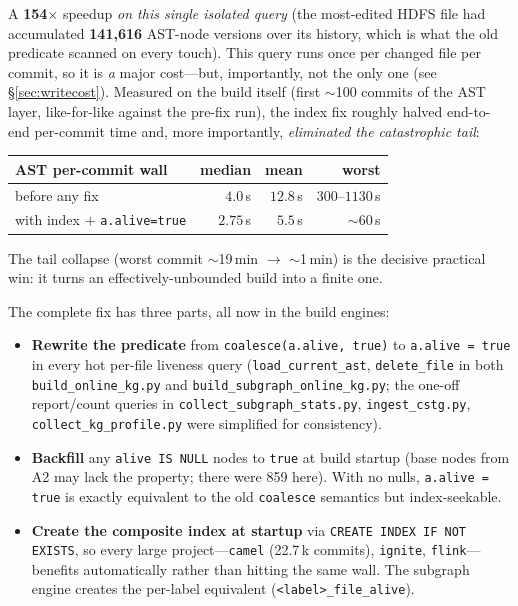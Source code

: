 \documentclass[11pt]{article}
\newcommand{\code}[1]{\texttt{#1}}
\begin{document}
A \textbf{154$\times$} speedup \emph{on this single isolated query} (the most-edited
HDFS file had accumulated \textbf{141{,}616} AST-node versions over its history,
which is what the old predicate scanned on every touch). This query runs once per
changed file per commit, so it is \emph{a} major cost---but, importantly, not the
only one (see \S\ref{sec:writecost}). Measured on the build itself (first
$\sim$100 commits of the AST layer, like-for-like against the pre-fix run), the
index fix roughly halved end-to-end per-commit time and, more importantly,
\emph{eliminated the catastrophic tail}:

\begin{center}
\begin{tabular}{@{}lrrr@{}}
\toprule
AST per-commit wall & median & mean & worst \\
\midrule
before any fix & $4.0$\,s & $12.8$\,s & $300$--$1130$\,s \\
with index $+$ \code{a.alive=true} & $2.75$\,s & $5.5$\,s & $\sim$$60$\,s \\
\bottomrule
\end{tabular}
\end{center}

The tail collapse (worst commit $\sim$19\,min $\to$ $\sim$1\,min) is the decisive
practical win: it turns an effectively-unbounded build into a finite one.

The complete fix has three parts, all now in the build engines:
\begin{itemize}
  \item \textbf{Rewrite the predicate} from \code{coalesce(a.alive, true)} to
  \code{a.alive = true} in every hot per-file liveness query
  (\code{load\_current\_ast}, \code{delete\_file} in both
  \code{build\_online\_kg.py} and \code{build\_subgraph\_online\_kg.py}; the
  one-off report/count queries in \code{collect\_subgraph\_stats.py},
  \code{ingest\_cstg.py}, \code{collect\_kg\_profile.py} were simplified for
  consistency).
  \item \textbf{Backfill} any \code{alive IS NULL} nodes to \code{true} at build
  startup (base nodes from A2 may lack the property; there were 859 here). With
  no nulls, \code{a.alive = true} is exactly equivalent to the old
  \code{coalesce} semantics but index-seekable.
  \item \textbf{Create the composite index at startup} via
  \code{CREATE INDEX IF NOT EXISTS}, so every large project---\code{camel}
  (22.7\,k commits), \code{ignite}, \code{flink}---benefits automatically rather
  than hitting the same wall. The subgraph engine creates the per-label
  equivalent (\code{<label>\_file\_alive}).
\end{itemize}
\end{document}
